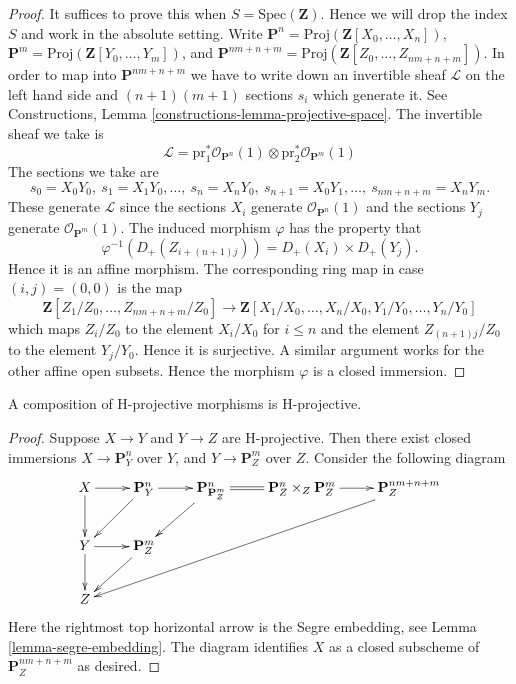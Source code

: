 \begin{proof}
It suffices to prove this when $S = \text{Spec}(\mathbf{Z})$.
Hence we will drop the index $S$ and work in the absolute setting.
Write $\mathbf{P}^n = \text{Proj}(\mathbf{Z}[X_0, \ldots, X_n])$,
$\mathbf{P}^m = \text{Proj}(\mathbf{Z}[Y_0, \ldots, Y_m])$,
and
$\mathbf{P}^{nm + n + m} =
\text{Proj}(\mathbf{Z}[Z_0, \ldots, Z_{nm + n + m}])$.
In order to map into $\mathbf{P}^{nm + n + m}$ we have to
write down an invertible sheaf $\mathcal{L}$ on the left hand
side and $(n + 1)(m + 1)$ sections $s_i$ which generate it.
See Constructions, Lemma \ref{constructions-lemma-projective-space}.
The invertible sheaf we take is
$$
\mathcal{L} =
\text{pr}_1^*\mathcal{O}_{\mathbf{P}^n}(1)
\otimes
\text{pr}_2^*\mathcal{O}_{\mathbf{P}^m}(1)
$$
The sections we take are
$$
s_0 = X_0Y_0, \ s_1 = X_1Y_0, \ldots, \ s_n = X_nY_0, \ 
s_{n + 1} = X_0Y_1, \ldots, \ s_{nm + n + m} = X_nY_m.
$$
These generate $\mathcal{L}$ since the sections $X_i$ generate
$\mathcal{O}_{\mathbf{P}^n}(1)$ and the sections $Y_j$ generate
$\mathcal{O}_{\mathbf{P}^m}(1)$. The induced morphism
$\varphi$ has the property that
$$
\varphi^{-1}(D_{+}(Z_{i + (n + 1)j})) = D_{+}(X_i) \times D_{+}(Y_j).
$$
Hence it is an affine morphism. The corresponding ring map in case
$(i, j) = (0, 0)$ is the map
$$
\mathbf{Z}[Z_1/Z_0, \ldots, Z_{nm + n + m}/Z_0]
\longrightarrow
\mathbf{Z}[X_1/X_0, \ldots, X_n/X_0, Y_1/Y_0, \ldots, Y_n/Y_0]
$$
which maps $Z_i/Z_0$ to the element $X_i/X_0$ for $i \leq n$ and
the element $Z_{(n + 1)j}/Z_0$ to the element $Y_j/Y_0$. Hence it
is surjective. A similar argument works for the other affine
open subsets. Hence the morphism $\varphi$ is a closed immersion.
\end{proof}

\begin{lemma}
\label{lemma-H-projective-composition}
A composition of H-projective morphisms is H-projective.
\end{lemma}

\begin{proof}
Suppose $X \to Y$ and $Y \to Z$ are H-projective.
Then there exist closed immersions $X \to \mathbf{P}^n_Y$
over $Y$, and $Y \to \mathbf{P}^m_Z$ over $Z$.
Consider the following diagram
$$
\xymatrix{
X \ar[r] \ar[d] &
\mathbf{P}^n_Y \ar[r] \ar[dl] &
\mathbf{P}^n_{\mathbf{P}^m_Z} \ar[dl] \ar@{=}[r] &
\mathbf{P}^n_Z \times_Z \mathbf{P}^m_Z \ar[r] &
\mathbf{P}^{nm + n + m}_Z \ar[ddllll] \\
Y \ar[r] \ar[d] & \mathbf{P}^m_Z \ar[dl] & \\
Z & &
}
$$
Here the rightmost top horizontal arrow is the Segre embedding,
see Lemma \ref{lemma-segre-embedding}. The diagram identifies
$X$ as a closed subscheme of $\mathbf{P}^{nm + n + m}_Z$ as desired.
\end{proof}

